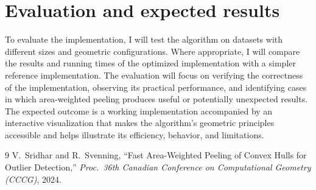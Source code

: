 \documentclass[10.5pt,a4paper]{article}
\begin{document}
\section*{Evaluation and expected results}
To evaluate the implementation, I will test the algorithm on datasets with different sizes and geometric configurations. Where appropriate, I will compare the results and running times of the optimized implementation with a simpler reference implementation.
The evaluation will focus on verifying the correctness of the implementation, observing its practical performance, and identifying cases in which area-weighted peeling produces useful or potentially unexpected results.
The expected outcome is a working implementation accompanied by an interactive visualization that makes the algorithm's geometric principles accessible and helps illustrate its efficiency, behavior, and limitations.

\begin{thebibliography}{9}\small
{} V.~Sridhar and R.~Svenning, ``Fast Area-Weighted Peeling of Convex Hulls for Outlier Detection,'' \emph{Proc.\ 36th Canadian Conference on Computational Geometry (CCCG)}, 2024.
\end{thebibliography}
\end{document}
